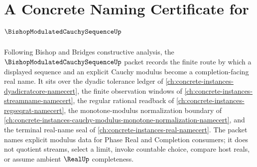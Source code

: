 \chapter{A Concrete Naming Certificate for $\BishopModulatedCauchySequenceUp$}
\label{ch:concrete-instances-bishop-modulated-cauchy-sequence-namecert}

Following Bishop and Bridges constructive analysis, the $\BishopModulatedCauchySequenceUp$ packet records the finite route by which a displayed sequence and an explicit Cauchy modulus become a completion-facing real name. It sits over the dyadic tolerance ledger of \autoref{ch:concrete-instances-dyadicratcore-namecert}, the finite observation windows of \autoref{ch:concrete-instances-streamname-namecert}, the regular rational readback of \autoref{ch:concrete-instances-regseqrat-namecert}, the monotone-modulus normalization boundary of \autoref{ch:concrete-instances-cauchy-modulus-monotone-normalization-namecert}, and the terminal real-name seal of \autoref{ch:concrete-instances-real-namecert}. The packet names explicit modulus data for Phase Real and Completion consumers; it does not quotient streams, select a limit, invoke countable choice, compare host reals, or assume ambient $\RealUp$ completeness.

